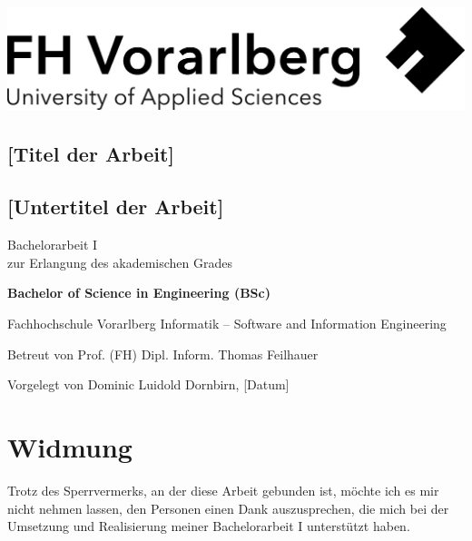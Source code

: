 \documentclass[a4paper,12pt,twoside]{scrreprt}
\begin{document}
\cleardoublepage %
\thispagestyle{empty}
\begin{titlepage}
    \begin{flushright}
    \includegraphics[width=0.4\linewidth]{images/Logo_FHV.jpg}
    \end{flushright}
    \begin{flushleft}
    \section*{[Titel der Arbeit]}
    \subsection*{[Untertitel der Arbeit]}
    \vspace{1cm}

    Bachelorarbeit I\\
    zur Erlangung des akademischen Grades
    \vspace{0.5cm}

    \textbf{Bachelor of Science in Engineering (BSc)}

    \vspace{1cm}
    Fachhochschule Vorarlberg\newline
    Informatik – Software and Information Engineering

    \vspace{0.5cm}

    Betreut von\newline
    Prof. (FH) Dipl. Inform. Thomas Feilhauer

    \vspace{0.5cm}

    Vorgelegt von\newline
    Dominic Luidold\newline
    Dornbirn, [Datum]
    \end{flushleft}
\end{titlepage}

\newpage
\section*{Widmung}
\label{sec:widmung}
Trotz des Sperrvermerks, an der diese Arbeit gebunden ist, möchte ich es mir nicht nehmen lassen, den Personen einen Dank auszusprechen, die mich bei der Umsetzung und Realisierung meiner Bachelorarbeit I unterstützt haben.
\end{document}
